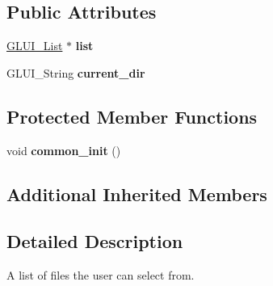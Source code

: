 \subsection*{Public Attributes}
\begin{DoxyCompactItemize}
\item 
\hypertarget{classGLUI__FileBrowser_a58ad435f622fdbff82775ca2313506c1}{\hyperlink{classGLUI__List}{G\-L\-U\-I\-\_\-\-List} $\ast$ {\bfseries list}}\label{classGLUI__FileBrowser_a58ad435f622fdbff82775ca2313506c1}

\item 
\hypertarget{classGLUI__FileBrowser_a91d9710c76d5a3cb3bc7486a627a86f3}{G\-L\-U\-I\-\_\-\-String {\bfseries current\-\_\-dir}}\label{classGLUI__FileBrowser_a91d9710c76d5a3cb3bc7486a627a86f3}

\end{DoxyCompactItemize}
\subsection*{Protected Member Functions}
\begin{DoxyCompactItemize}
\item 
\hypertarget{classGLUI__FileBrowser_a0618241a9315adf0b2cd3514b93ac317}{void {\bfseries common\-\_\-init} ()}\label{classGLUI__FileBrowser_a0618241a9315adf0b2cd3514b93ac317}

\end{DoxyCompactItemize}
\subsection*{Additional Inherited Members}


\subsection{Detailed Description}
A list of files the user can select from. 


